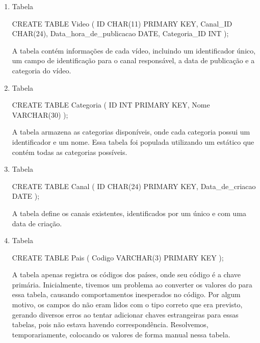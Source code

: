   \begin{enumerate}
    \item Tabela 

    \begin{code}
      CREATE TABLE Video (
        ID CHAR(11) PRIMARY KEY,
        Canal_ID CHAR(24),
        Data_hora_de_publicacao DATE,
        Categoria_ID INT
      );
    \end{code}

    A tabela  contém informações de cada vídeo, incluindo um identificador único, um campo de identificação para o canal responsável, a data de publicação e a categoria do vídeo.

    \item Tabela 

    \begin{code}
      CREATE TABLE Categoria (
        ID INT PRIMARY KEY,
        Nome VARCHAR(30)
      );
    \end{code}

    A tabela  armazena as categorias disponíveis, onde cada categoria possui um identificador e um nome. Essa tabela foi populada utilizando um  estático que contém todas as categorias possíveis.

    \item Tabela 

    \begin{code}
      CREATE TABLE Canal (
        ID CHAR(24) PRIMARY KEY,
        Data_de_criacao DATE
      );
    \end{code}

      A tabela  define os canais existentes, identificados por um  único e com uma data de criação.

    \item Tabela 

    \begin{code}
      CREATE TABLE Pais (
        Codigo VARCHAR(3) PRIMARY KEY
      );
    \end{code}

    A tabela  apenas registra os códigos dos países, onde seu código é a chave primária. Inicialmente, tivemos um problema ao converter os valores do  para essa tabela, causando comportamentos inesperados no código. Por algum motivo, os campos do  não eram lidos com o tipo correto que era previsto, gerando diversos erros ao tentar adicionar chaves estrangeiras para essas tabelas, pois não estava havendo correspondência. Resolvemos, temporariamente, colocando os valores de forma manual nessa tabela.


\end{enumerate}
